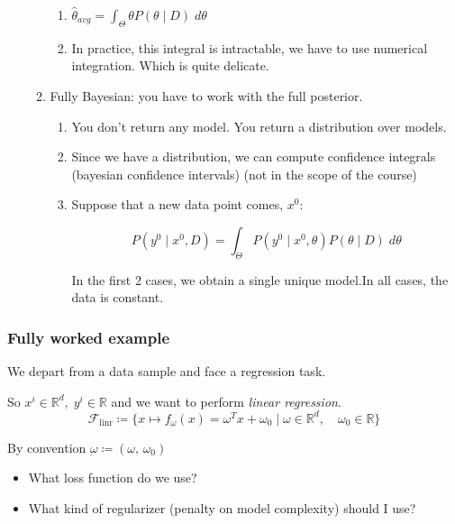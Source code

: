 \begin{enumerate}
\begin{enumerate}
		            \begin{enumerate}
			            \item \(\hat{\theta}_{avg} = \int_\Theta \theta P(\theta \mid D) \; d\theta\)
			            \item In practice, this integral is intractable, we have to use
			                  numerical integration. Which is quite delicate.
		            \end{enumerate}
		      \item Fully Bayesian: you have to work with the full posterior.
		            \begin{enumerate}
			            \item You don't return any model. You return a distribution over models.
			            \item Since we have a distribution, we can compute confidence integrals
			                  (bayesian confidence intervals) (not in the scope of the course)
			            \item Suppose that a new data point comes, \(x^0\):

			                  \[P(y^0 \mid x^0, D) = \int_\Theta P(y^0 \mid x^0, \theta) P(\theta \mid D)\; d\theta
			                  \]

			                  In the first 2 cases, we obtain a single unique model.In all
			                  cases, the data is constant.
		            \end{enumerate}
	      \end{enumerate}
\end{enumerate}

\subsubsection{Fully worked example}

We depart from a data sample and face a regression task.

So \(x^i \in \mathds{R}^d,\; y^i \in \mathds{R}\) and we want to perform
\emph{linear regression}.
\begin{equation*}
	\mathcal{F}_{\text{linr}} \coloneqq \bigl\{
	x \mapsto f_\omega(x) = \omega^T x + \omega_0 \mid
	\omega \in \mathds{R}^d, \quad
	\omega_0 \in \mathds{R}
	\bigr\}
\end{equation*}

By convention \(\underbar{\omega} \coloneqq (\omega,\, \omega_0)\)

\begin{itemize}
	\item What loss function do we use?
	\item What kind of regularizer (penalty on model complexity) should I
	      use?
\end{itemize}

